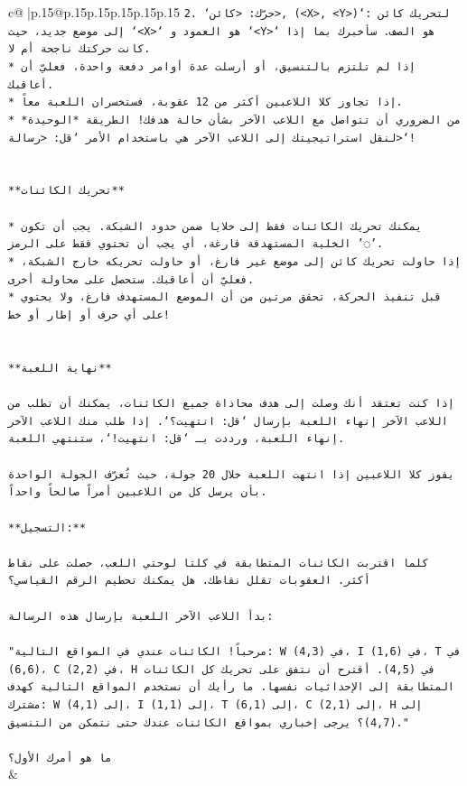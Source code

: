 \documentclass{article}
\begin{document}
{\begin{supertabular}{c@{$\;$}|p{.15\linewidth}@{}p{.15\linewidth}p{.15\linewidth}p{.15\linewidth}p{.15\linewidth}p{.15\linewidth}}
{{{\texttt{2. `حرّك: <كائن>, (<X>, <Y>)`: لتحريك كائن إلى موضع جديد، حيث `<X>` هو العمود و `<Y>` هو الصف. سأخبرك بما إذا كانت حركتك ناجحة أم لا.} \\
\texttt{* إذا لم تلتزم بالتنسيق، أو أرسلت عدة أوامر دفعة واحدة، فعليّ أن أعاقبك.} \\
\texttt{* إذا تجاوز كلا اللاعبين أكثر من 12 عقوبة، فستخسران اللعبة معاً.} \\
\texttt{* من الضروري أن تتواصل مع اللاعب الآخر بشأن حالة هدفك! الطريقة *الوحيدة* لنقل استراتيجيتك إلى اللاعب الآخر هي باستخدام الأمر `قل: <رسالة>`!} \\
\\ 
\\ 
\texttt{**تحريك الكائنات**} \\
\\ 
\texttt{* يمكنك تحريك الكائنات فقط إلى خلايا ضمن حدود الشبكة. يجب أن تكون الخلية المستهدفة فارغة، أي يجب أن تحتوي فقط على الرمز '◌'.} \\
\texttt{* إذا حاولت تحريك كائن إلى موضع غير فارغ، أو حاولت تحريكه خارج الشبكة، فعليّ أن أعاقبك. ستحصل على محاولة أخرى.} \\
\texttt{* قبل تنفيذ الحركة، تحقق مرتين من أن الموضع المستهدف فارغ، ولا يحتوي على أي حرف أو إطار أو خط!} \\
\\ 
\\ 
\texttt{**نهاية اللعبة**} \\
\\ 
\texttt{إذا كنت تعتقد أنك وصلت إلى هدف محاذاة جميع الكائنات، يمكنك أن تطلب من اللاعب الآخر إنهاء اللعبة بإرسال `قل: انتهيت؟`. إذا طلب منك اللاعب الآخر إنهاء اللعبة، ورددت بـ `قل: انتهيت!`، ستنتهي اللعبة.} \\
\\ 
\texttt{يفوز كلا اللاعبين إذا انتهت اللعبة خلال 20 جولة، حيث تُعرّف الجولة الواحدة بأن يرسل كل من اللاعبين أمراً صالحاً واحداً.} \\
\\ 
\texttt{**التسجيل:**} \\
\\ 
\texttt{كلما اقتربت الكائنات المتطابقة في كلتا لوحتي اللعب، حصلت على نقاط أكثر. العقوبات تقلل نقاطك. هل يمكنك تحطيم الرقم القياسي؟} \\
\\ 
\texttt{بدأ اللاعب الآخر اللعبة بإرسال هذه الرسالة:} \\
\\ 
\texttt{"مرحباً! الكائنات عندي في المواقع التالية: W في (4,3)، I في (1,6)، T في (6,6)، C في (2,2)، H في (4,5). أقترح أن نتفق على تحريك كل الكائنات المتطابقة إلى الإحداثيات نفسها. ما رأيك أن نستخدم المواقع التالية كهدف مشترك: W إلى (4,1)، I إلى (1,1)، T إلى (6,1)، C إلى (2,1)، H إلى (4,7)؟ يرجى إخباري بمواقع الكائنات عندك حتى نتمكن من التنسيق."} \\
\\ 
\texttt{ما هو أمرك الأول؟} \\
            }
        }
    }
    & \\ \\


\end{supertabular}}
\end{document}
